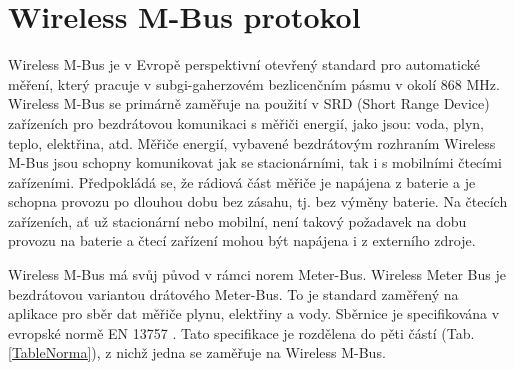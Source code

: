 \chapter{Wireless M-Bus protokol}
Wireless M-Bus je v Evropě perspektivní otevřený standard pro automatické měření, který pracuje v subgi-gaherzovém bezlicenčním pásmu v okolí 868 MHz. Wireless M-Bus se primárně zaměřuje na použití v SRD (Short Range Device) zařízeních pro bezdrátovou komunikaci s měřiči energií, jako jsou: voda, plyn, teplo, elektřina, atd. Měřiče energií, vybavené bezdrátovým rozhraním Wireless M-Bus jsou schopny komunikovat jak se stacionárními, tak i s mobilními čtecími zařízeními. Předpokládá se, že rádiová část měřiče je napájena z baterie a je schopna provozu po dlouhou dobu bez zásahu, tj. bez výměny baterie. Na čtecích zařízeních, ať už stacionární nebo mobilní, není takový požadavek na dobu provozu na baterie a čtecí zařízení mohou být napájena i z externího zdroje.

Wireless M-Bus má svůj původ v rámci norem Meter-Bus. Wireless Meter Bus je bezdrátovou variantou drátového Meter-Bus. To je standard zaměřený na aplikace pro sběr dat měřiče plynu, elektřiny a vody. Sběrnice je specifikována v evropské normě EN 13757 \cite{Norma1}. Tato specifikace je rozdělena do pěti částí (Tab.\ref{TableNorma}), z nichž jedna se zaměřuje na Wireless M-Bus.

